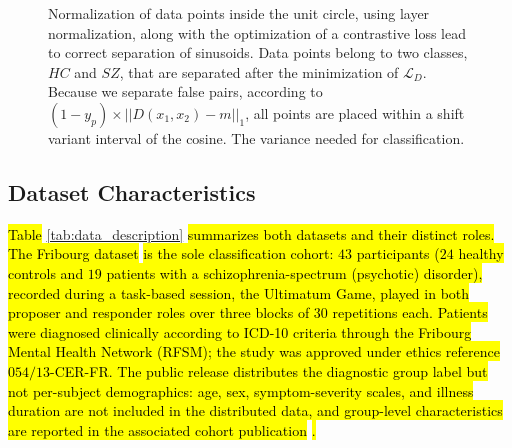 \documentclass{article}
\begin{document}
\begin{figure}[ht]
\begin{tikzpicture}
        
    \end{tikzpicture}
    \caption{Normalization of data points inside the unit circle, using layer normalization, along with the optimization of a contrastive loss lead to correct separation of sinusoids. Data points belong to two classes, $HC$ and $SZ$, that are separated after the minimization of $\mathcal{L}_D$. Because we separate false pairs, according to $(1-y_p) \times ||D(x_1,x_2)-m||_1$, all points are placed within a shift variant interval of the cosine. The variance needed for classification.}
    \label{fig:sinusoid_separation}
\end{figure}


\subsection{Dataset Characteristics}\label{materials:data}

\hl{Table }\ref{tab:data_description}\hl{ summarizes both datasets and their distinct roles. The Fribourg dataset }\cite{dataset2022fribourg}\hl{ is the sole classification cohort: $43$ participants ($24$ healthy controls and $19$ patients with a schizophrenia-spectrum (psychotic) disorder), recorded during a task-based session, the Ultimatum Game, played in both proposer and responder roles over three blocks of $30$ repetitions each. Patients were diagnosed clinically according to ICD-10 criteria through the Fribourg Mental Health Network (RFSM); the study was approved under ethics reference $054/13$-CER-FR. The public release distributes the diagnostic group label but not per-subject demographics: age, sex, symptom-severity scales, and illness duration are not included in the distributed data, and group-level characteristics are reported in the associated cohort publication }\cite{horat2018impaired}\hl{.}
\end{document}
